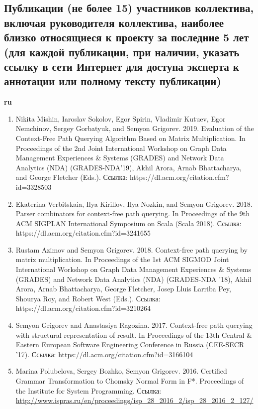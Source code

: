 \documentclass[12pt]{article}  %
\theoremstyle{remark}
\begin{document}
\subsection{Публикации (не более 15) участников коллектива, включая руководителя коллектива, наиболее близко относящиеся к проекту за последние 5 лет (для каждой публикации, при наличии, указать ссылку в сети Интернет для доступа эксперта к аннотации или полному тексту публикации)}

\textbf{ru}\\
\begin{enumerate}
\item Nikita Mishin, Iaroslav Sokolov, Egor Spirin, Vladimir Kutuev, Egor Nemchinov, Sergey Gorbatyuk, and Semyon Grigorev. 2019. Evaluation of the Context-Free Path Querying Algorithm Based on Matrix Multiplication. In Proceedings of the 2nd Joint International Workshop on Graph Data Management Experiences \& Systems (GRADES) and Network Data Analytics (NDA) (GRADES-NDA'19), Akhil Arora, Arnab Bhattacharya, and George Fletcher (Eds.).
Ссылка: https://dl.acm.org/citation.cfm?id=3328503

\item Ekaterina Verbitskaia, Ilya Kirillov, Ilya Nozkin, and Semyon Grigorev. 2018. Parser combinators for context-free path querying. In Proceedings of the 9th ACM SIGPLAN International Symposium on Scala (Scala 2018).
Ссылка: https://dl.acm.org/citation.cfm?id=3241655

\item Rustam Azimov and Semyon Grigorev. 2018. Context-free path querying by matrix multiplication. In Proceedings of the 1st ACM SIGMOD Joint International Workshop on Graph Data Management Experiences \& Systems (GRADES) and Network Data Analytics (NDA) (GRADES-NDA '18), Akhil Arora, Arnab Bhattacharya, George Fletcher, Josep Lluis Larriba Pey, Shourya Roy, and Robert West (Eds.).
Ссылка: https://dl.acm.org/citation.cfm?id=3210264

\item Semyon Grigorev and Anastasiya Ragozina. 2017. Context-free path querying with structural representation of result. In Proceedings of the 13th Central \& Eastern European Software Engineering Conference in Russia (CEE-SECR '17).
Ссылка: https://dl.acm.org/citation.cfm?id=3166104

\item Marina Polubelova, Sergey Bozhko, Semyon Grigorev. 2016. Certified Grammar Transformation to Chomsky Normal Form in F*. Proceedings of the Institute for System Programming.
Ссылка: \url{http://www.ispras.ru/en/proceedings/isp_28_2016_2/isp_28_2016_2_127/}


\end{enumerate}
\end{document}
